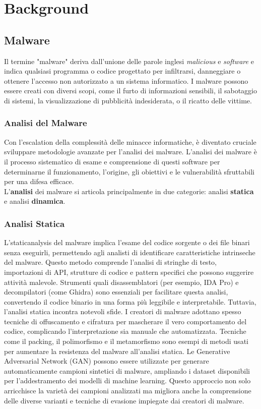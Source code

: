 \chapter{Background}
\label{cap:background}

\section{Malware}
Il termine "malware" deriva dall'unione delle parole inglesi \emph{malicious} e \emph{software} e indica qualsiasi programma o codice progettato per infiltrarsi, danneggiare o ottenere l'accesso non autorizzato a un sistema informatico. I malware possono essere creati con diversi scopi, come il furto di informazioni sensibili, il sabotaggio di sistemi, la visualizzazione di pubblicità indesiderata, o il ricatto delle vittime.

\subsection{Analisi del Malware}
Con l'escalation della complessità delle minacce informatiche, è diventato cruciale sviluppare metodologie avanzate per l'analisi dei malware. L'analisi dei malware è il processo sistematico di esame e comprensione di questi software per determinarne il funzionamento, l'origine, gli obiettivi e le vulnerabilità sfruttabili per una difesa efficace. \\ 
L'\textbf{analisi} dei malware si articola principalmente in due categorie: analisi \textbf{statica} e analisi \textbf{dinamica}.

\subsection{Analisi Statica}
L'\gls{staticanalysis} del malware implica l'esame del codice sorgente o dei file binari senza eseguirli, permettendo agli analisti di identificare caratteristiche intrinseche del malware. Questo metodo comprende l'analisi di stringhe di testo, importazioni di API, strutture di codice e pattern specifici che possono suggerire attività malevole. Strumenti quali disassemblatori (per esempio, IDA Pro) e decompilatori (come Ghidra) sono essenziali per facilitare questa analisi, convertendo il codice binario in una forma più leggibile e interpretabile.
Tuttavia, l'analisi statica incontra notevoli sfide. I creatori di malware adottano spesso tecniche di offuscamento e cifratura per mascherare il vero comportamento del codice, complicando l'interpretazione sia manuale che automatizzata. Tecniche come il packing, il polimorfismo e il metamorfismo sono esempi di metodi usati per aumentare la resistenza del malware all'analisi statica.
Le Generative Adversarial Network (GAN) possono essere utilizzate per generare automaticamente campioni sintetici di malware, ampliando i dataset disponibili per l'addestramento dei modelli di machine learning. Questo approccio non solo arricchisce la varietà dei campioni analizzati ma migliora anche la comprensione delle diverse varianti e tecniche di evasione impiegate dai creatori di malware.

